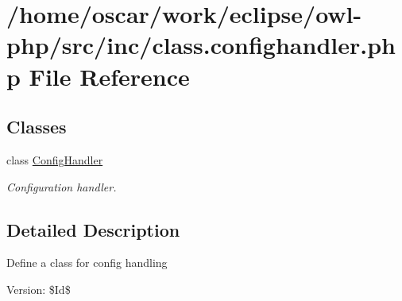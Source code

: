 \hypertarget{class_8confighandler_8php}{
\section{/home/oscar/work/eclipse/owl-php/src/inc/class.confighandler.php File Reference}
\label{class_8confighandler_8php}
}
\subsection*{Classes}
\begin{CompactItemize}
\item 
class \hyperlink{classConfigHandler}{ConfigHandler}
\begin{CompactList}\small\item\em Configuration handler. \item\end{CompactList}\end{CompactItemize}


\subsection{Detailed Description}
Define a class for config handling \begin{Desc}
\item[Version:]\$Id\$ \end{Desc}
